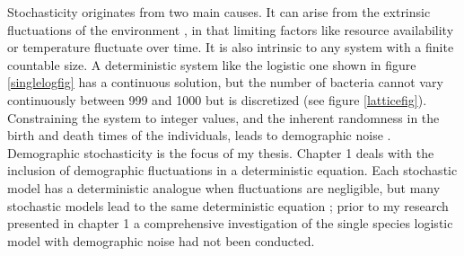 Stochasticity originates from two main causes. 
It can arise from the extrinsic fluctuations of the environment \cite{Kamenev2008a,Chotibut2017a}, in that limiting factors like resource availability or temperature fluctuate over time. 
It is also intrinsic to any system with a finite countable size. 
A deterministic system like the logistic one shown in figure \ref{singlelogfig} has a continuous solution, but the number of bacteria cannot vary continuously between 999 and 1000 but is discretized (see figure \ref{latticefig}). 
Constraining the system to integer values, and the inherent randomness in the birth and death times of the individuals, leads to demographic noise \cite{Assaf2006,Gottesman2012,Dobrinevski2012,Gabel2013,Fisher2014,Constable2015,Lin2012,Chotibut2015,Young2018}. 
Demographic stochasticity is the focus of my thesis. 
Chapter 1 deals with the inclusion of demographic fluctuations in a deterministic equation. %
Each stochastic model has a deterministic analogue when fluctuations are negligible, but many stochastic models lead to the same deterministic equation \cite{Nisbet1982,Norden1982,Nasell2001,Rouzine2001,Gardiner2004a}; prior to my research presented in chapter 1 a comprehensive investigation of the single species logistic model with demographic noise had not been conducted. %

